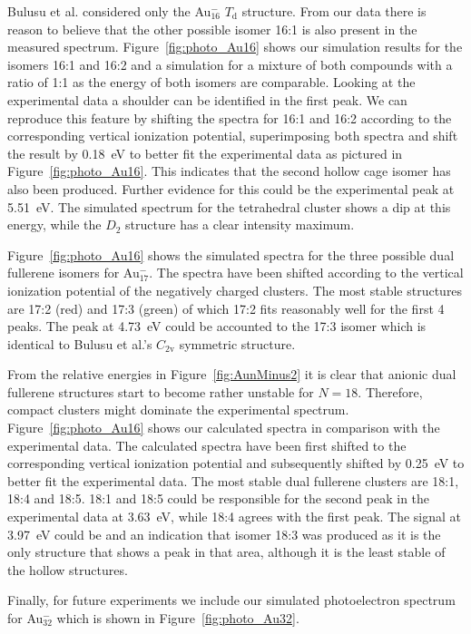Bulusu et al. considered only the Au$_{16}^-$ $T_\mathrm{d}$ structure. From
our data there is reason to believe that the other possible isomer 16:1 is also
present in the measured spectrum. Figure~\ref{fig:photo_Au16} shows our
simulation results for the isomers 16:1 and 16:2 and a simulation for a mixture
of both compounds with a ratio of 1:1 as the energy of both isomers are
comparable.  Looking at the experimental data a shoulder can be identified in
the first peak. We can reproduce this feature by shifting the spectra for 16:1
and 16:2 according to the corresponding vertical ionization potential,
superimposing both spectra and shift the result by 0.18~eV to better fit the
experimental data as pictured in Figure~\ref{fig:photo_Au16}. This indicates
that the second hollow cage isomer has also been produced.  Further evidence
for this could be the experimental peak at 5.51~eV. The simulated spectrum for
the tetrahedral cluster shows a dip at this energy, while the $D_\mathrm{2}$
structure has a clear intensity maximum. 

Figure~\ref{fig:photo_Au16} shows the simulated spectra for the three possible
dual fullerene isomers for Au$_{17}^-$. The spectra have been shifted according
to the vertical ionization potential of the negatively charged clusters. The
most stable structures are 17:2 (red) and 17:3 (green) of which 17:2 fits
reasonably well for the first 4 peaks. The peak at 4.73~eV could be accounted
to the 17:3 isomer which is identical to Bulusu et al.'s $C_\mathrm{2v}$
symmetric structure.

From the relative energies in Figure~\ref{fig:AunMinus2} it is clear that
anionic dual fullerene structures start to become rather unstable for $N=18$.
Therefore, compact clusters might dominate the experimental spectrum.
Figure~\ref{fig:photo_Au16} shows our calculated spectra in comparison with the
experimental data. The calculated spectra have been first shifted to the
corresponding vertical ionization potential and subsequently shifted by 0.25~eV
to better fit the experimental data. The most stable dual fullerene clusters
are 18:1, 18:4 and 18:5. 18:1 and 18:5 could be responsible for the second peak
in the experimental data at 3.63~eV, while 18:4 agrees with the first peak. The
signal at 3.97~eV could be and an indication that isomer 18:3 was produced as
it is the only structure that shows a peak in that area, although it is the
least stable of the hollow structures.

Finally, for future experiments we include our simulated photoelectron spectrum
for Au$_{32}^-$ which is shown in Figure~\ref{fig:photo_Au32}. 

